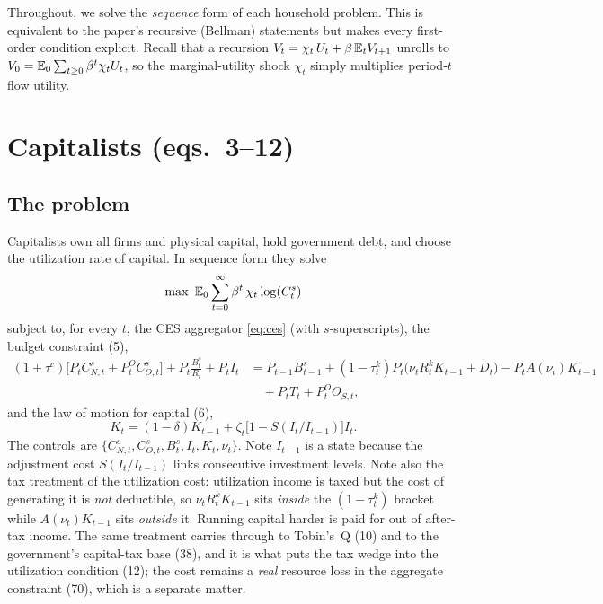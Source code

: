 Throughout, we solve the \emph{sequence} form of each household problem. This is equivalent to the
paper's recursive (Bellman) statements but makes every first-order condition explicit. Recall that a
recursion $V_t=\chi_t\,U_t+\beta\,\mathbb{E}_t V_{t+1}$ unrolls to
$V_0=\mathbb{E}_0\sum_{t\ge0}\beta^t\chi_t U_t$, so the marginal-utility shock $\chi_t$ simply multiplies
period-$t$ flow utility.

\section{Capitalists (eqs.\ 3--12)}

\subsection{The problem}
Capitalists own all firms and physical capital, hold government debt, and choose the utilization
rate of capital. In sequence form they solve
\begin{equation}\label{eq:cap-obj}
\max\ \mathbb{E}_0\sum_{t=0}^\infty \beta^t\,\chi_t\log(C^s_t)
\end{equation}
subject to, for every $t$, the CES aggregator \eqref{eq:ces} (with $s$-superscripts), the budget
constraint (5),
\begin{align}
(1+\tau^c)\big[P_t C^s_{N,t}+P^O_t C^s_{O,t}\big]+P_t\frac{B^s_t}{R_t}+P_t I_t
&=P_{t-1}B^s_{t-1}+(1-\tau^k_t)P_t\big(\nu_t R^k_t K_{t-1}+D_t\big)-P_tA(\nu_t)K_{t-1}\nonumber\\
&\quad+P_t T_t+P^O_t O_{S,t},\tag{P-5}\label{eq:cap-bc}
\end{align}
and the law of motion for capital (6),
\begin{equation}\label{eq:cap-lom}
K_t=(1-\delta)K_{t-1}+\zeta_t\big[1-S(I_t/I_{t-1})\big]I_t .
\tag{P-6}
\end{equation}
The controls are $\{C^s_{N,t},C^s_{O,t},B^s_t,I_t,K_t,\nu_t\}$. Note $I_{t-1}$ is a state because
the adjustment cost $S(I_t/I_{t-1})$ links consecutive investment levels. Note also the tax treatment of
the utilization cost: utilization income is taxed but the cost of generating it is \emph{not}
deductible, so $\nu_tR^k_tK_{t-1}$ sits \emph{inside} the $(1-\tau^k_t)$ bracket while $A(\nu_t)K_{t-1}$
sits \emph{outside} it. Running capital harder is paid for out of after-tax income. The same treatment
carries through to Tobin's~Q (10) and to the government's capital-tax base (38), and it is what puts the
tax wedge into the utilization condition (12); the cost remains a \emph{real} resource loss in the
aggregate constraint (70), which is a separate matter.

